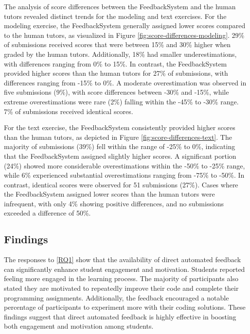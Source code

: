 \documentclass[sigconf,screen,review,anonymous]{acmart}
\begin{document}
The analysis of score differences between the FeedbackSystem and the human tutors revealed distinct trends for the modeling and text exercises.
For the modeling exercise, the FeedbackSystem generally assigned lower scores compared to the human tutors, as visualized in Figure \ref{fig:score-differences-modeling}.
29\% of submissions received scores that were between 15\% and 30\% higher when graded by the human tutors.
Additionally, 18\% had smaller underestimations, with differences ranging from 0\% to 15\%.
In contrast, the FeedbackSystem provided higher scores than the human tutors for 27\% of submissions, with differences ranging from -15\% to 0\%.
A moderate overestimation was observed in five submissions (9\%), with score differences between -30\% and -15\%, while extreme overestimations were rare (2\%) falling within the -45\% to -30\% range.
7\% of submissions received identical scores.

For the text exercise, the FeedbackSystem consistently provided higher scores than the human tutors, as depicted in Figure \ref{fig:score-differences-text}.
The majority of submissions (39\%) fell within the range of -25\% to 0\%, indicating that the FeedbackSystem assigned slightly higher scores.
A significant portion (24\%) showed more considerable overestimations within the -50\% to -25\% range, while 6\% experienced substantial overestimations ranging from -75\% to -50\%.
In contrast, identical scores were observed for 51 submissions (27\%).
Cases where the FeedbackSystem assigned lower scores than the human tutors were infrequent, with only 4\% showing positive differences, and no submissions exceeded a difference of 50\%.

\subsection{Findings}

The responses to \ref{RQ1} show that the availability of direct automated feedback can significantly enhance student engagement and motivation.
Students reported feeling more engaged in the learning process.
The majority of participants also stated they are motivated to repeatedly improve their code and complete their programming assignments.
Additionally, the feedback encouraged a notable percentage of participants to experiment more with their coding solutions.
These findings suggest that direct automated feedback is highly effective in boosting both engagement and motivation among students.
\end{document}
